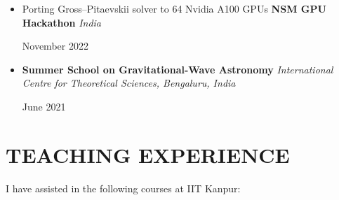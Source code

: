 \documentclass[10pt,a4paper]{article}
\begin{document}
\begin{itemize}[leftmargin=1.5em, itemsep=6pt, parsep=0pt]
  \item \begin{minipage}[t]{0.80\linewidth}
          Porting Gross--Pitaevskii solver to 64 Nvidia A100 GPUs \newline
          \textbf{NSM GPU Hackathon} \newline
          \textit{India}
        \end{minipage}%
        \begin{minipage}[t]{0.20\linewidth}
          \raggedleft
          November 2022
        \end{minipage}

  \item \begin{minipage}[t]{0.80\linewidth}
          \textbf{Summer School on Gravitational-Wave Astronomy} \newline
          \textit{International Centre for Theoretical Sciences, Bengaluru, India}
        \end{minipage}%
        \begin{minipage}[t]{0.20\linewidth}
          \raggedleft
          June 2021
        \end{minipage}
\end{itemize}

\section{TEACHING EXPERIENCE}
I have assisted in the following courses at IIT Kanpur:
\end{document}
